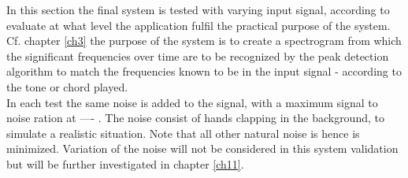 In this section the final system is tested with varying input signal, according to evaluate at what level the application fulfil the practical purpose of the system. Cf. chapter \ref{ch3} the purpose of the system is to create a spectrogram from which the significant frequencies over time are to be recognized by the peak detection algorithm to match the frequencies known to be in the input signal - according to the tone or chord played.\\
In each test the same noise is added to the signal, with a maximum signal to noise ration at ---- . The noise consist of hands clapping in the background, to simulate a realistic situation. Note that all other natural noise is hence is minimized. Variation of the noise will not be considered in this system validation but will be further investigated in chapter \ref{ch11}.         
